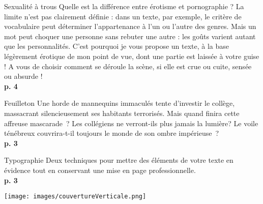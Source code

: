 \documentclass{parch}
\begin{document}
	
	\thispagestyle{empty}
	
	\vspace*{-.2cm}\noindent{\color{mediumGrey}\rule{0.87\textwidth}{1mm}}\hspace{3pt}{décembre 2015}
	
	\vspace*{3\baselineskip}
	\noindent\begin{minipage}{.32\textwidth}
		\begin{parchAbstractTheme}{Sexualité à trous}
			Quelle est la différence entre érotisme et pornographie ? La limite n'est pas clairement définie : dans un texte, par exemple, le critère de vocabulaire peut déterminer l'appartenance à l'un ou l'autre des genres. Mais un mot peut choquer une personne sans rebuter une autre : les goûts varient autant que les personnalités. C'est pourquoi je vous propose un texte, à la base légèrement érotique de mon point de vue, dont une partie est laissée à votre guise ! A vous de choisir comment se déroule la scène, si elle est crue ou cuite, sensée ou absurde !\\\null\hfill\textbf{p. 4}
		\end{parchAbstractTheme}
		
		\begin{parchAbstractTheme}{Feuilleton}
			Une horde de mannequins immaculés tente d'investir le collège, massacrant silencieusement ses habitants terrorisés. Mais quand finira cette affreuse mascarade ? Les collégiens ne verront-ils plus jamais la lumière? Le voile ténébreux couvrira-t-il toujours le monde de son ombre impérieuse ?\\\null\hfill\textbf{p. 3}
		\end{parchAbstractTheme}
		
		
		\begin{parchAbstractTheme}{Typographie}
			Deux techniques pour mettre des éléments de votre texte en évidence tout en conservant une mise en page professionnelle.\\\null\hfill\textbf{p. 3}
		\end{parchAbstractTheme}
	\end{minipage}\hspace*{.03\textwidth}
	\noindent\begin{minipage}{.65\textwidth}
		\noindent\texttt{[image: images/couvertureVerticale.png]}
		
		\vspace*{2\baselineskip}
	\end{minipage}
	
\end{document}

